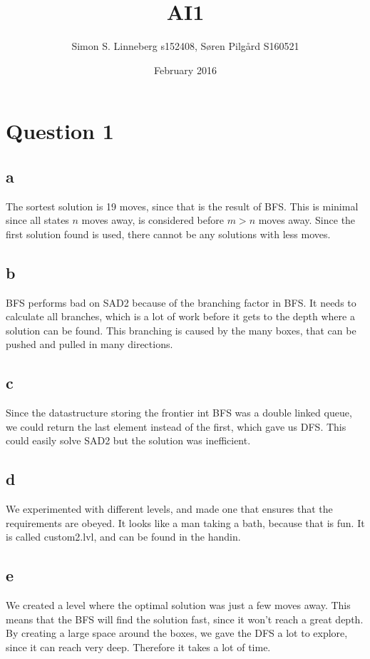 \documentclass{article}
\title{AI1}
\author{Simon S. Linneberg s152408, Søren Pilgård S160521}
\date{February 2016}
\begin{document}
\maketitle

\section{Question 1}
\subsection{ a }
The sortest solution is 19 moves, since that is the result of BFS. This is minimal since
all states $n$ moves away, is considered before $m > n$ moves away. Since the first
solution found is used, there cannot be any solutions with less moves.

\subsection{ b }
BFS performs bad on SAD2 because of the branching factor in BFS. It needs to calculate
all branches, which is a lot of work before it gets to the depth where a solution can be found.
This branching is caused by the many boxes, that can be pushed and pulled in many directions.\\

\subsection{c}
Since the datastructure storing the frontier int BFS was a double linked queue, we could
return the last element instead of the first, which gave us DFS. This could easily solve
SAD2 but the solution was inefficient.\\

\subsection{d}
We experimented with different levels, and made one that ensures that the requirements are obeyed.
It looks like a man taking a bath, because that is fun. It is called custom2.lvl, and can be found
in the handin.

\subsection{e}
We created a level where the optimal solution was just a few moves away. This means that the BFS will
find the solution fast, since it won't reach a great depth. By creating a large space around the boxes,
we gave the DFS a lot to explore, since it can reach very deep. Therefore it takes a lot of time.\\
\end{document}
